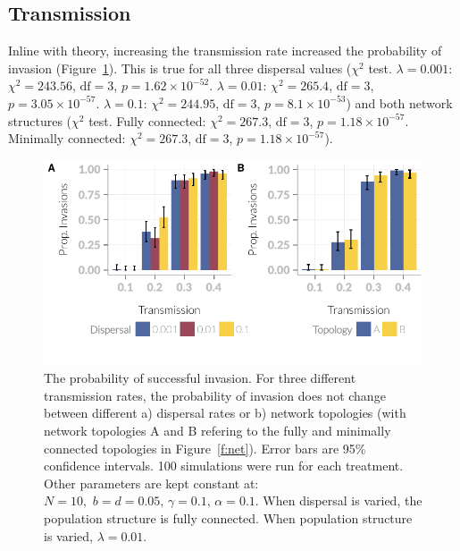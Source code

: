  
\subsection{Transmission}

Inline with theory, increasing the transmission rate increased the probability of invasion (Figure~\ref{f:invasionPropPlots}).
This is true for all three dispersal values ($\chi^2$ test. $\lambda = 0.001$: $\chi^2 = 243.56$, $\text{df} = 3$, $p = \ensuremath{1.62\times 10^{-52}}$. $\lambda = 0.01$: $\chi^2 = 265.4$, $\text{df} = 3$, $p = \ensuremath{3.05\times 10^{-57}}$. $\lambda = 0.1$: $\chi^2 = 244.95$, $\text{df} = 3$, $p = \ensuremath{8.1\times 10^{-53}}$) and both network structures ($\chi^2$ test. Fully connected: $\chi^2 = 267.3$, $\text{df} = 3$, $p = \ensuremath{1.18\times 10^{-57}}$. Minimally connected: $\chi^2 =  267.3$, $\text{df} = 3$, $p = \ensuremath{1.18\times 10^{-57}}$).






\begin{knitrout}\footnotesize
{}\color{fgcolor}\begin{figure}[t]

{\centering \includegraphics[width=\textwidth]{figure/invasionPropPlots-1} 

}

\caption[The probability of invasion across different dispersal rates and network topologies.]{The probability of successful invasion. 
  For three different transmission rates, the probability of invasion does not change between different a) dispersal rates or b) network topologies (with network topologies A and B refering to the    fully and minimally connected topologies in Figure~\ref{f:net}). 
  Error bars are 95\% confidence intervals. 
  100 simulations were run for each treatment.
  Other parameters are kept constant at: $N = 10,\, \, b = d = 0.05,\, \gamma = 0.1,\, \alpha = 0.1$. 
  When dispersal is varied, the population structure is fully connected. When population structure is varied, $\lambda = 0.01$.}\label{f:invasionPropPlots}
\end{figure}


\end{knitrout}





